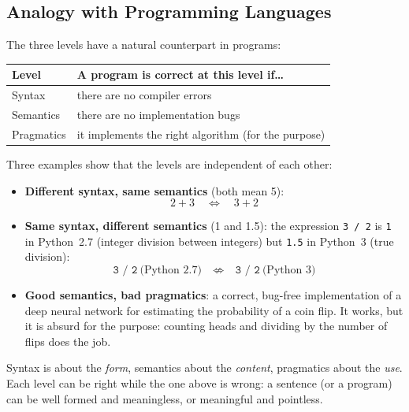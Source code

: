 \subsection{Analogy with Programming Languages}
\label{sec:programming-analogy}

The three levels have a natural counterpart in programs:

\begin{center}
\begin{tabular}{@{}l l@{}}
\toprule
\textbf{Level} & \textbf{A program is correct at this level if\ldots} \\
\midrule
\textcolor{nbred}{Syntax}      & there are no compiler errors \\
\textcolor{nbblue}{Semantics}  & there are no implementation bugs \\
\textcolor{nbgreen}{Pragmatics} & it implements the right algorithm (for the purpose) \\
\bottomrule
\end{tabular}
\end{center}

Three examples show that the levels are independent of each other:

\begin{itemize}
  \item \textbf{Different \textcolor{nbred}{syntax}, same \textcolor{nbblue}{semantics}}
        (both mean 5):
        \[ 2 + 3 \quad\Longleftrightarrow\quad 3 + 2 \]
  \item \textbf{Same \textcolor{nbred}{syntax}, different \textcolor{nbblue}{semantics}}
        (1 and 1.5): the expression \texttt{3 / 2} is \texttt{1} in Python~2.7 (integer
        division between integers) but \texttt{1.5} in Python~3 (true division):
        \[ \texttt{3 / 2}\ \text{(Python 2.7)} \quad\not\Longleftrightarrow\quad
           \texttt{3 / 2}\ \text{(Python 3)} \]
  \item \textbf{Good \textcolor{nbblue}{semantics}, bad \textcolor{nbgreen}{pragmatics}}:
        a correct, bug-free implementation of a deep neural network for estimating the
        probability of a coin flip. It works, but it is absurd for the purpose: counting
        heads and dividing by the number of flips does the job.
\end{itemize}

\begin{nbintuition}
Syntax is about the \emph{form}, semantics about the \emph{content}, pragmatics about
the \emph{use}. Each level can be right while the one above is wrong: a sentence (or a
program) can be well formed and meaningless, or meaningful and pointless.
\end{nbintuition}
